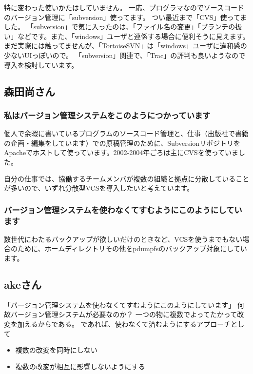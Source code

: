 \documentclass[mingoth,a4paper]{jsarticle}
\begin{document}
特に変わった使いかたはしていません。
一応、プログラマなのでソースコードのバージョン管理に「subversion」使ってます。
つい最近まで「CVS」使ってました。
「subversion」で気に入ったのは、「ファイル名の変更」「ブランチの扱い」などです。また、「windows」ユーザと連係する場合に便利そうに見えます。
まだ実際には触ってませんが、「TortoiseSVN」は「windows」ユーザに違和感の少ないUIっぽいので。
「subversion」関連で、「Trac」の評判も良いようなので導入を検討しています。

\subsection{森田尚さん}

\subsubsection{私はバージョン管理システムをこのようにつかっています}

個人で余暇に書いているプログラムのソースコード管理と、仕事（出版社で書籍
の企画・編集をしています）での原稿管理のために、Subversionリポジトリを
Apacheでホストして使っています。2002-2004年ごろは主にCVSを使っていました。

自分の仕事では、協働するチームメンバが複数の組織と拠点に分散していること
が多いので、いずれ分散型VCSを導入したいと考えています。

\subsubsection{バージョン管理システムを使わなくてすむようにこのようにしています}

数世代にわたるバックアップが欲しいだけのときなど、VCSを使うまでもない場
合のために、ホームディレクトリその他をpdumpfsのバックアップ対象にしてい
ます。

\subsection{akeさん}

「バージョン管理システムを使わなくてすむようにこのようにしています」
何故バージョン管理システムが必要なのか？
一つの物に複数でよってたかって改変を加えるからである。
であれば、使わなくて済むようにするアプローチとして
\begin{itemize}
 \item 複数の改変を同時にしない
 \item 複数の改変が相互に影響しないようにする
\end{itemize}
\end{document}
